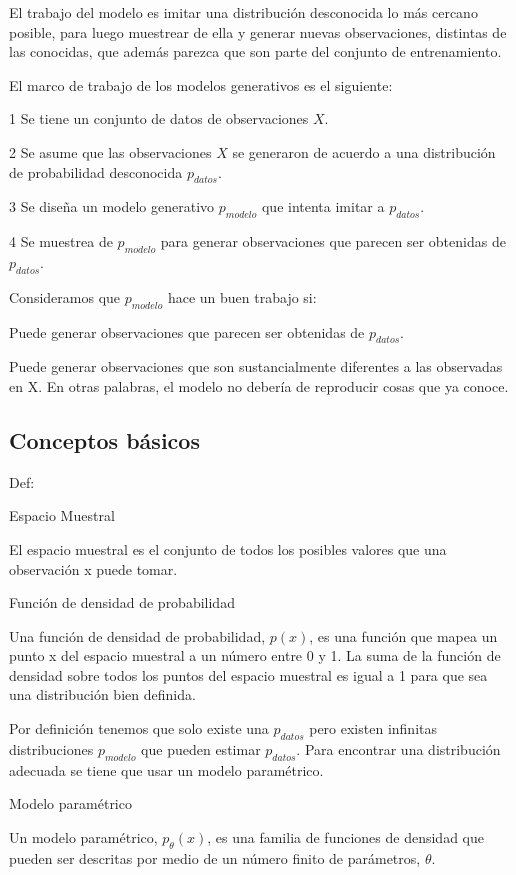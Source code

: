 El trabajo del modelo es imitar una distribución desconocida lo más cercano posible, para luego muestrear de ella y generar nuevas observaciones, distintas de las conocidas, que además parezca que son parte del conjunto de entrenamiento.

El marco de trabajo de los modelos generativos es el siguiente:

1 Se tiene un conjunto de datos de observaciones $X$.

2 Se asume que las observaciones $X$ se generaron de acuerdo a una distribución de probabilidad desconocida $p_{datos}$.

3 Se diseña un modelo generativo $p_{modelo}$ que intenta imitar a $p_{datos}$.

4 Se muestrea de $p_{modelo}$ para generar observaciones que parecen ser obtenidas de $p_{datos}$.

Consideramos que $p_{modelo}$ hace un buen trabajo si:

Puede generar observaciones que parecen ser obtenidas de $p_{datos}$.

Puede generar observaciones que son sustancialmente diferentes a las observadas en X. En otras palabras, el modelo no debería de reproducir cosas que ya conoce.

\subsection{Conceptos básicos}

Def:

Espacio Muestral

El espacio muestral es el conjunto de todos los posibles valores que una observación x puede tomar.

Función de densidad de probabilidad

Una función de densidad de probabilidad, $p(x)$, es una función que mapea un punto x del espacio muestral a un número entre 0 y 1. La suma de la función de densidad sobre todos los puntos del espacio muestral es igual a 1 para que sea una distribución bien definida.

Por definición tenemos que solo existe una $p_{datos}$ pero existen infinitas distribuciones $p_{modelo}$ que pueden estimar $p_{datos}$. Para encontrar una distribución adecuada se tiene que usar un modelo paramétrico.

Modelo paramétrico

Un modelo paramétrico, $p_{\theta}(x)$, es una familia de funciones de densidad que pueden ser descritas por medio de un número finito de parámetros, $\theta$.
